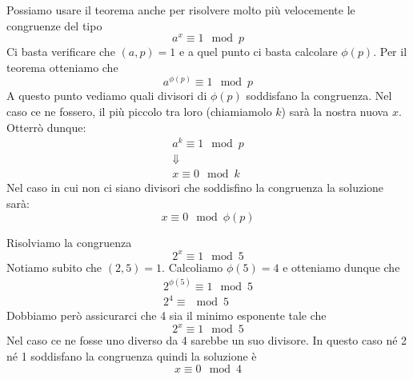Possiamo usare il teorema anche per risolvere molto pi\`u velocemente le congruenze del tipo
\begin{equation*}
	a^x \equiv 1 \mod{p}
\end{equation*}
Ci basta verificare che $(a, p) = 1$ e a quel punto ci basta calcolare $\phi (p)$. Per il teorema
otteniamo che
\begin{equation*}
	a^{\phi (p)} \equiv 1 \mod{p}
\end{equation*}
A questo punto vediamo quali divisori di $\phi (p)$ soddisfano la congruenza. Nel caso ce ne
fossero, il pi\`u piccolo tra loro (chiamiamolo $k$) sar\`a la nostra nuova $x$.
Otterr\`o dunque:
\begin{equation*}
	\begin{array}{c}
		a^k \equiv 1 \mod{p} \\
		\Downarrow           \\
		x \equiv 0 \mod{k}
	\end{array}
\end{equation*}
Nel caso in cui non ci siano divisori che soddisfino la congruenza la soluzione sar\`a:
\begin{equation*}
	x \equiv 0 \mod{\phi (p)}
\end{equation*}

\begin{example}
	Risolviamo la congruenza
	\begin{equation*}
		2^x \equiv 1 \mod{5}
	\end{equation*}
	Notiamo subito che $(2, 5) = 1$. Calcoliamo $\phi (5) = 4$ e otteniamo dunque che
	\begin{equation*}
		\begin{array}{l}
			2^{\phi (5)} \equiv 1 \mod{5} \\
			2^{4} \equiv \mod{5}
		\end{array}
	\end{equation*}
	Dobbiamo per\`o assicurarci che 4 sia il minimo esponente tale che
	\begin{equation*}
		2^x \equiv 1 \mod{5}
	\end{equation*}
	Nel caso ce ne fosse uno diverso da 4 sarebbe un suo divisore. In questo caso n\'e 2 n\'e 1
	soddisfano la congruenza quindi la soluzione \`e
	\begin{equation*}
		x \equiv 0 \mod{4}
	\end{equation*}
\end{example}
